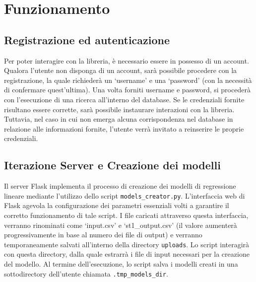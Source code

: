 \documentclass[a4paper,10pt]{article}
\begin{document}
\section{Funzionamento}

\subsection{Registrazione ed autenticazione}
Per poter interagire con la libreria, è necessario essere in possesso di un account. Qualora l'utente non disponga di un account, 
sarà possibile procedere con la registrazione, la quale richiederà un `username' e una `password' (con la necessità di confermare quest'ultima). 
Una volta forniti username e password, si procederà con l'esecuzione di una ricerca all'interno del database.
Se le credenziali fornite risultano essere corrette, sarà possibile instaurare interazioni con la libreria. 
Tuttavia, nel caso in cui non emerga alcuna corrispondenza nel database in relazione alle informazioni fornite, 
l'utente verrà invitato a reinserire le proprie credenziali. 

\subsection{Iterazione Server e Creazione dei modelli}

Il server Flask implementa il processo di creazione dei modelli di regressione lineare mediante l'utilizzo dello script \texttt{models\_creator.py}. 
L'interfaccia web di Flask agevola la configurazione dei parametri essenziali volti a garantire il corretto funzionamento di tale script. 
I file caricati attraverso questa interfaccia, verranno rinominati come `input.csv' e `st1\_output.csv' (il valore aumenterà progressivamente in base al numero dei file di output)
e verranno temporaneamente salvati all'interno della directory \texttt{uploads}.
Lo script interagirà con questa directory, dalla quale estrarrà i file di input necessari per la creazione del modello.
Al termine dell'esecuzione, lo script salva i modelli creati in una sottodirectory dell'utente chiamata \texttt{.tmp\_models\_dir}.
\end{document}
